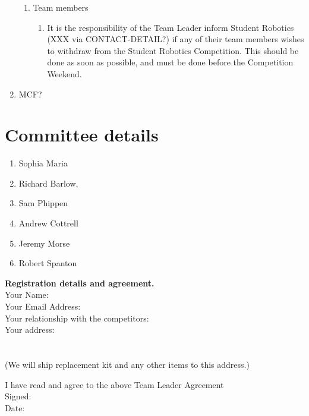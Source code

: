 \documentclass[a4paper, 11pt]{scrartcl}
\begin{document}
\begin{enumerate}
\begin{enumerate}
\item Team members
\begin{enumerate}
\item It is the responsibility of the Team Leader inform Student Robotics
(XXX via CONTACT-DETAIL?) if any of their team members wishes to withdraw
from the Student Robotics Competition. This should be done as soon as possible,
and must be done before the Competition Weekend.
\end{enumerate}

\end{enumerate}

\item MCF?

\end{enumerate}

\appendix



\section{Committee details}

\begin{enumerate}
\item Sophia Maria
\item Richard Barlow,
\item Sam Phippen
\item Andrew Cottrell
\item Jeremy Morse
\item Robert Spanton
\end{enumerate}

\noindent
\textbf{Registration details and agreement.} \\
\doublespacing
\noindent
Your Name:\hrulefill\\
Your Email Address:\hrulefill\\
Your relationship with the competitors:\hrulefill\\
Your address:\hrulefill\\
\hbox{}\hrulefill\\
\hbox{}\hrulefill\\
(We will ship replacement kit and any other items to this address.)

\noindent
\dotfill\hfill

\noindent
I have read and agree to the above Team Leader Agreement\\
Signed:\hrulefill\\
Date:\hrulefill\\

\singlespacing
\end{document}
